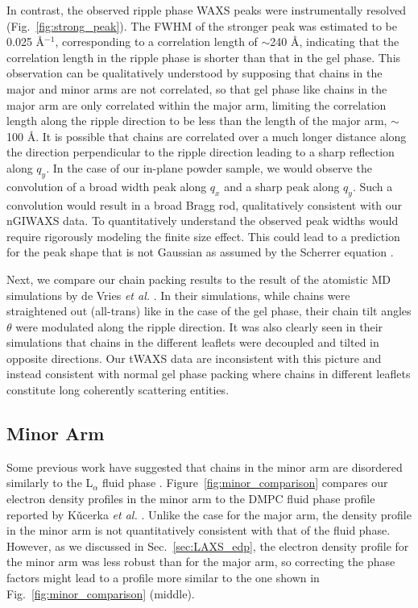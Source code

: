 In contrast, the observed ripple phase WAXS 
peaks were instrumentally 
resolved (Fig.~\ref{fig:strong_peak}). 
The FWHM of the stronger peak was estimated to be 0.025 \AA$^{-1}$,
corresponding to a correlation length of $\sim$240 \AA,
indicating that the correlation length in the ripple phase is shorter 
than that in the gel phase.
This observation can be qualitatively understood by supposing that chains in the major
and minor arms are not correlated, so that gel phase like chains in the 
major arm are only correlated within the major arm, limiting the correlation
length along the ripple direction to be less than the length of the major 
arm, $\sim$100 \AA. 
It is possible that chains are correlated over a much longer distance 
along the direction perpendicular to the ripple direction leading to
a sharp reflection along $q_y$.
In the case of our in-plane powder sample, we would observe the convolution
of a broad width peak along $q_x$ and a sharp peak along $q_y$. 
Such a convolution would result in a broad Bragg rod,
qualitatively consistent with our nGIWAXS data.
To quantitatively understand the observed peak widths would require rigorously
modeling the finite size effect. This could lead to a prediction
for the peak shape that is not Gaussian as assumed by the Scherrer equation 
\cite{ref:Warren69}.

Next, we compare our chain packing results to the result of the
atomistic MD simulations by de Vries \textit{et al.} \cite{ref:deVries05}.
In their simulations, while chains were straightened out (all-trans) like in 
the case of the gel phase, their chain tilt angles $\theta$ were modulated 
along the ripple direction. It was also
clearly seen in their simulations that chains in the different leaflets were 
decoupled and tilted in opposite directions. Our tWAXS data are 
inconsistent with this picture and instead consistent with normal
gel phase packing where chains in different leaflets constitute long coherently
scattering entities.

\subsection{Minor Arm}
Some previous work have suggested that chains in the minor arm are disordered 
similarly to the L$_\alpha$ fluid phase \cite{ref:Schneider83,ref:Sun96,ref:Pabst04,ref:Riske09}.
Figure~\ref{fig:minor_comparison} compares our electron density profiles
in the minor arm to the DMPC fluid phase profile reported by 
K\v{u}cerka \textit{et al.} \cite{Kucerka05_BPJ}.
Unlike 
the case for the major arm, the density profile in the minor arm
is not quantitatively consistent with that of the fluid phase. 
However, as we discussed in Sec.~\ref{sec:LAXS_edp}, the electron density profile
for the minor arm was less robust than for the major arm,
so correcting the phase factors might lead to a profile more similar 
to the one shown in Fig.~\ref{fig:minor_comparison} (middle).

